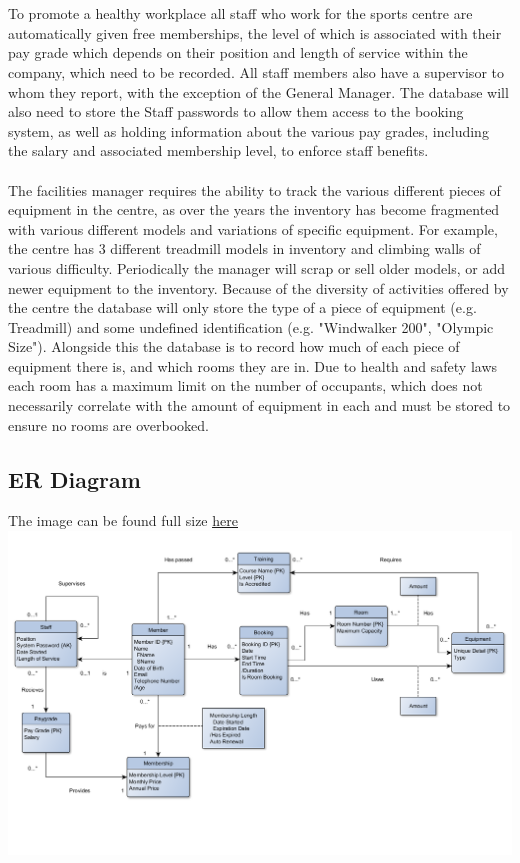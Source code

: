 \documentclass[a4paper, titlepage]{article}
\begin{document}
	\\\\
	To promote a healthy workplace all staff who work for the sports centre are automatically given free memberships, the level of which is associated with their pay grade which depends on their position and length of service within the company, which need to be recorded. All staff members also have a supervisor to whom they report, with the exception of the General Manager. The database will also need to store the Staff passwords to allow them access to the booking system, as well as holding information about the various pay grades, including the salary and associated membership level, to enforce staff benefits.
	\\\\
	The facilities manager requires the ability to track the various different pieces of equipment in the centre, as over the years the inventory has become fragmented with various different models and variations of specific equipment. For example, the centre has 3 different treadmill models in inventory and climbing walls of various difficulty. Periodically the manager will scrap or sell older models, or add newer equipment to the inventory. Because of the diversity of activities offered by the centre the database will only store the type of a piece of equipment (e.g. Treadmill) and some undefined identification (e.g. "Windwalker 200", "Olympic Size"). Alongside this the database is to record how much of each piece of equipment there is, and which rooms they are in. Due to health and safety laws each room has a maximum limit on the number of occupants, which does not necessarily correlate with the amount of equipment in each and must be stored to ensure no rooms are overbooked.  
	
	\subsection{ER Diagram}
	The image can be found full size \href{https://drive.google.com/file/d/0B1dD0VdrKINebGRlLVN0OFhrQ2c/view?usp=sharing}{\underline{here}}\\
	\includegraphics[scale=0.32]{ERDiagram}
	
\end{document}
